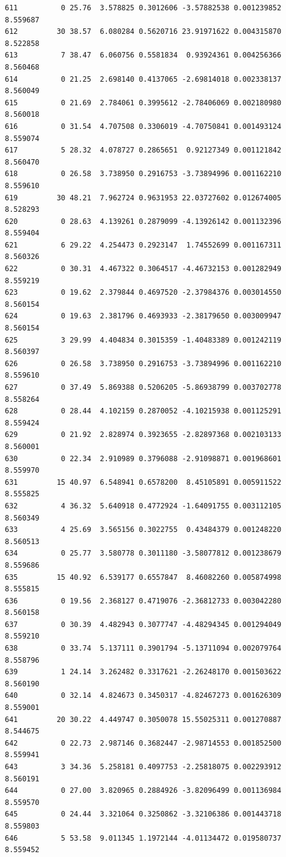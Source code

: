 \documentclass[]{book}
\theoremstyle{definition}
\theoremstyle{definition}
\theoremstyle{definition}
\theoremstyle{remark}
\begin{document}
\begin{verbatim}
611          0 25.76  3.578825 0.3012606 -3.57882538 0.001239852 8.559687
612         30 38.57  6.080284 0.5620716 23.91971622 0.004315870 8.522858
613          7 38.47  6.060756 0.5581834  0.93924361 0.004256366 8.560468
614          0 21.25  2.698140 0.4137065 -2.69814018 0.002338137 8.560049
615          0 21.69  2.784061 0.3995612 -2.78406069 0.002180980 8.560018
616          0 31.54  4.707508 0.3306019 -4.70750841 0.001493124 8.559074
617          5 28.32  4.078727 0.2865651  0.92127349 0.001121842 8.560470
618          0 26.58  3.738950 0.2916753 -3.73894996 0.001162210 8.559610
619         30 48.21  7.962724 0.9631953 22.03727602 0.012674005 8.528293
620          0 28.63  4.139261 0.2879099 -4.13926142 0.001132396 8.559404
621          6 29.22  4.254473 0.2923147  1.74552699 0.001167311 8.560326
622          0 30.31  4.467322 0.3064517 -4.46732153 0.001282949 8.559219
623          0 19.62  2.379844 0.4697520 -2.37984376 0.003014550 8.560154
624          0 19.63  2.381796 0.4693933 -2.38179650 0.003009947 8.560154
625          3 29.99  4.404834 0.3015359 -1.40483389 0.001242119 8.560397
626          0 26.58  3.738950 0.2916753 -3.73894996 0.001162210 8.559610
627          0 37.49  5.869388 0.5206205 -5.86938799 0.003702778 8.558264
628          0 28.44  4.102159 0.2870052 -4.10215938 0.001125291 8.559424
629          0 21.92  2.828974 0.3923655 -2.82897368 0.002103133 8.560001
630          0 22.34  2.910989 0.3796088 -2.91098871 0.001968601 8.559970
631         15 40.97  6.548941 0.6578200  8.45105891 0.005911522 8.555825
632          4 36.32  5.640918 0.4772924 -1.64091755 0.003112105 8.560349
633          4 25.69  3.565156 0.3022755  0.43484379 0.001248220 8.560513
634          0 25.77  3.580778 0.3011180 -3.58077812 0.001238679 8.559686
635         15 40.92  6.539177 0.6557847  8.46082260 0.005874998 8.555815
636          0 19.56  2.368127 0.4719076 -2.36812733 0.003042280 8.560158
637          0 30.39  4.482943 0.3077747 -4.48294345 0.001294049 8.559210
638          0 33.74  5.137111 0.3901794 -5.13711094 0.002079764 8.558796
639          1 24.14  3.262482 0.3317621 -2.26248170 0.001503622 8.560190
640          0 32.14  4.824673 0.3450317 -4.82467273 0.001626309 8.559001
641         20 30.22  4.449747 0.3050078 15.55025311 0.001270887 8.544675
642          0 22.73  2.987146 0.3682447 -2.98714553 0.001852500 8.559941
643          3 34.36  5.258181 0.4097753 -2.25818075 0.002293912 8.560191
644          0 27.00  3.820965 0.2884926 -3.82096499 0.001136984 8.559570
645          0 24.44  3.321064 0.3250862 -3.32106386 0.001443718 8.559803
646          5 53.58  9.011345 1.1972144 -4.01134472 0.019580737 8.559452

\end{verbatim}
\end{document}
